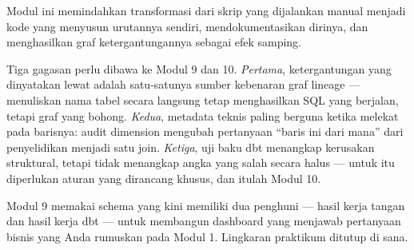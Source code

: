 Modul ini memindahkan transformasi dari skrip yang dijalankan manual menjadi
kode yang menyusun urutannya sendiri, mendokumentasikan dirinya, dan
menghasilkan graf ketergantungannya sebagai efek samping.

Tiga gagasan perlu dibawa ke Modul 9 dan 10. \emph{Pertama}, ketergantungan
yang dinyatakan lewat  adalah satu-satunya sumber kebenaran graf
lineage --- menuliskan nama tabel secara langsung tetap menghasilkan SQL yang
berjalan, tetapi graf yang bohong. \emph{Kedua}, metadata teknis paling
berguna ketika melekat pada barisnya: audit dimension mengubah pertanyaan
``baris ini dari mana'' dari penyelidikan menjadi satu join. \emph{Ketiga},
uji baku dbt menangkap kerusakan struktural, tetapi tidak menangkap angka yang
salah secara halus --- untuk itu diperlukan aturan yang dirancang khusus, dan
itulah Modul 10.

Modul 9 memakai schema  yang kini memiliki dua penghuni ---
hasil kerja tangan dan hasil kerja dbt --- untuk membangun dashboard yang
menjawab pertanyaan bisnis yang Anda rumuskan pada Modul 1. Lingkaran
praktikum ditutup di sana.
